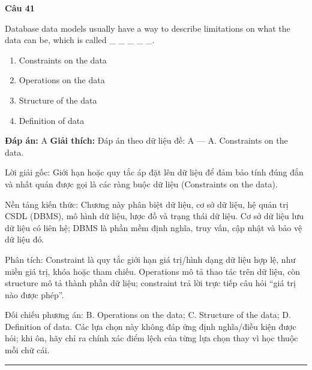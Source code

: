 \documentclass[11pt,a4paper]{article}
\newenvironment{question}[1]{%
  \par\vspace{1em}\noindent\textbf{\large Câu #1}\par\vspace{0.4em}
}{%
  \par\vspace{1em}\hrule\vspace{0.6em}
}
\newenvironment{choices}{%
  \begin{enumerate}[label=\textbf{\Alph*.},leftmargin=2.2em,itemsep=2pt,topsep=3pt]
}{%
  \end{enumerate}
}
\newcommand{\choice}{\item}
\begin{document}
\begin{question}{41}
Database data models usually have a way to describe limitations on what the data can be, which is called _ _ _ _ _.
\begin{choices}
\choice Constraints on the data
\choice Operations on the data
\choice Structure of the data
\choice Definition of data
\end{choices}
\textbf{Đáp án:} A
\textbf{Giải thích:} Đáp án theo dữ liệu đề: A — A. Constraints on the data.

Lời giải gốc: Giới hạn hoặc quy tắc áp đặt lên dữ liệu để đảm bảo tính đúng đắn và nhất quán được gọi là các ràng buộc dữ liệu (Constraints on the data).

Nền tảng kiến thức: Chương này phân biệt dữ liệu, cơ sở dữ liệu, hệ quản trị CSDL (DBMS), mô hình dữ liệu, lược đồ và trạng thái dữ liệu. Cơ sở dữ liệu lưu dữ liệu có liên hệ; DBMS là phần mềm định nghĩa, truy vấn, cập nhật và bảo vệ dữ liệu đó.

Phân tích: Constraint là quy tắc giới hạn giá trị/hình dạng dữ liệu hợp lệ, như miền giá trị, khóa hoặc tham chiếu. Operations mô tả thao tác trên dữ liệu, còn structure mô tả thành phần dữ liệu; constraint trả lời trực tiếp câu hỏi “giá trị nào được phép”.

Đối chiếu phương án: B. Operations on the data; C. Structure of the data; D. Definition of data. Các lựa chọn này không đáp ứng định nghĩa/điều kiện được hỏi; khi ôn, hãy chỉ ra chính xác điểm lệch của từng lựa chọn thay vì học thuộc mỗi chữ cái.
\end{question}
\end{document}
